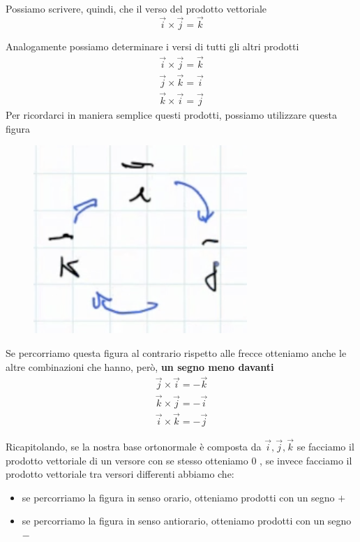 Possiamo scrivere, quindi, che il verso del prodotto vettoriale
$$ \overrightarrow{i} \times \overrightarrow{j} = \overrightarrow{k} $$

Analogamente possiamo determinare i versi di tutti gli altri prodotti
\begin{align*}
\overrightarrow{i} \times \overrightarrow{j} = \overrightarrow{k} \\
\overrightarrow{j} \times \overrightarrow{k} = \overrightarrow{i} \\
\overrightarrow{k} \times \overrightarrow{i} = \overrightarrow{j}
\end{align*}
\newpage
Per ricordarci in maniera semplice questi prodotti, possiamo utilizzare questa figura

\begin{figure}[h]
\begin{center}
\includegraphics[width = 0.5 \textwidth]{lezione1/images/vettoriale5}
\label{fig:vettoriale5}
\end{center}
\end{figure}

Se percorriamo questa figura al contrario rispetto alle frecce otteniamo anche le altre combinazioni che hanno, però, \textbf{un segno meno davanti}
\begin{align*}
\overrightarrow{j} \times \overrightarrow{i} = - \overrightarrow{k} \\
\overrightarrow{k} \times \overrightarrow{j} = - \overrightarrow{i} \\
\overrightarrow{i} \times \overrightarrow{k} = - \overrightarrow{j}
\end{align*}

Ricapitolando, se la nostra base ortonormale è composta da $ {\overrightarrow{i}, \overrightarrow{j}, \overrightarrow{k}} $ se facciamo il prodotto vettoriale di un versore con se stesso otteniamo 0 , se invece facciamo il prodotto vettoriale tra versori differenti abbiamo che:
\begin{itemize}
\item se percorriamo la figura in senso orario, otteniamo prodotti con un segno $ + $
\item se percorriamo la figura in senso antiorario, otteniamo prodotti con un segno $ - $
\end{itemize}

